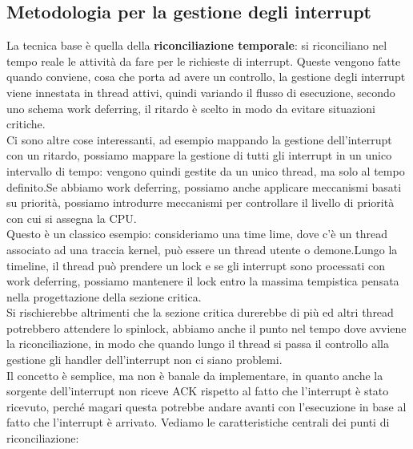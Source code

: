 \documentclass[12pt, oneside]{extbook}
\begin{document}
\subsection{Metodologia per la gestione degli interrupt}
La tecnica base è quella della \textbf{riconciliazione temporale}: si riconciliano nel tempo reale le attività da fare per le richieste di interrupt. Queste vengono fatte quando conviene, cosa che porta ad avere un controllo, la gestione degli interrupt viene innestata in thread attivi, quindi variando il flusso di esecuzione, secondo uno schema work deferring, il ritardo è scelto in modo da evitare situazioni critiche.\\Ci sono altre cose interessanti, ad esempio mappando la gestione dell'interrupt con un ritardo, possiamo mappare la gestione di tutti gli interrupt in un unico intervallo di tempo: vengono quindi gestite da un unico thread, ma solo al tempo definito.Se abbiamo work deferring, possiamo anche applicare meccanismi basati su priorità, possiamo introdurre meccanismi per controllare il livello di priorità con cui si assegna la CPU.\\Questo è un classico esempio:
consideriamo una time lime, dove c'è un thread associato ad una traccia kernel, può essere un thread utente o demone.Lungo la timeline, il thread può prendere un lock e se gli interrupt sono processati con work deferring, possiamo mantenere il lock entro la massima tempistica pensata nella progettazione della sezione critica.\\Si rischierebbe altrimenti che la sezione critica durerebbe di più ed altri thread potrebbero attendere lo spinlock, abbiamo anche il punto nel tempo dove avviene la riconciliazione, in modo che quando lungo il thread si passa il controllo  alla gestione gli handler dell'interrupt non ci siano problemi.\\Il concetto è semplice, ma non è banale da implementare, in quanto anche la sorgente dell'interrupt non riceve ACK rispetto al fatto che l'interrupt è stato ricevuto, perché magari questa potrebbe andare avanti con l'esecuzione in base al fatto che l'interrupt è arrivato. Vediamo le caratteristiche centrali dei punti di riconciliazione:
\end{document}
